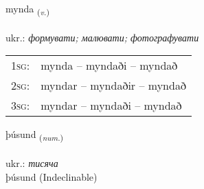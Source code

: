 \documentclass[frontgrid, backgrid]{flacards}\usepackage[]{graphicx}\usepackage[]{xcolor}
\begin{document}
\renewcommand{\flhead}{\vskip5pt \fboxsep=0pt {\small\bfseries\footnotesize Sagnorð | дієслово}}
\renewcommand{\fcfoot}{\vskip5pt \fboxsep=0pt \hspace{2pt}{\small\bfseries\footnotesize 1K}}

\renewcommand{\blhead}{\vskip5pt {\small\bfseries\footnotesize Sagnorð | дієслово }}
\renewcommand{\bcfoot}{\vskip5pt \hspace{2pt}{\small\bfseries\footnotesize 1K}}


{mynda \small{\textsubscript{(\textit{v.})}} \\[1ex] %
\textphonetic{[mɪnta]} \\
ukr.: \emph{формувати; малювати; фотографувати} \\  [2ex]
\renewcommand*{\arraystretch}{0.8}
\begin{tabular}{p{1cm}l}
\textsc{1sg}: & mynda -- myndaði -- myndað \\ 
\textsc{2sg}: & myndar -- myndaðir -- myndað \\ 
\textsc{3sg}: & myndar -- myndaði -- myndað \\ 
\end{tabular}
}


\renewcommand{\flhead}{\vskip5pt \fboxsep=0pt {\small\bfseries\footnotesize Töluorð | чисельник}}
\renewcommand{\fcfoot}{\vskip5pt \fboxsep=0pt \hspace{2pt}{\small\bfseries\footnotesize 1K}}

\renewcommand{\blhead}{\vskip5pt {\small\bfseries\footnotesize Töluorð | чисельник }}
\renewcommand{\bcfoot}{\vskip5pt \hspace{2pt}{\small\bfseries\footnotesize 1K}}


{þúsund \small{\textsubscript{(\textit{num.})}} \\[1ex]
\textphonetic{[θuːsʏnt]} \\
ukr.: \emph{тисяча} \\  [2ex]
þúsund (Indeclinable)}
\end{document}
